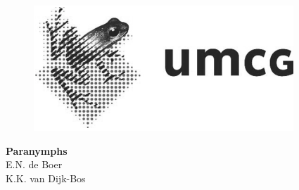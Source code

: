 \begin{figure}[!htbp]
	\centering
	
	\begin{minipage}[b]{0.24\textwidth}
		\includegraphics[width=\textwidth]{img/colofon_umcg_zw}
	\end{minipage}
	\hfill
	\begin{minipage}[b]{0.29\textwidth}
	\end{minipage}
	 \hfill
	\begin{minipage}[b]{0.23\textwidth}
	\end{minipage}
\end{figure}

\clearpage



\clearpage

\noindent
\textbf{Paranymphs}\\
E.N. de Boer\\
K.K. van Dijk-Bos\\

